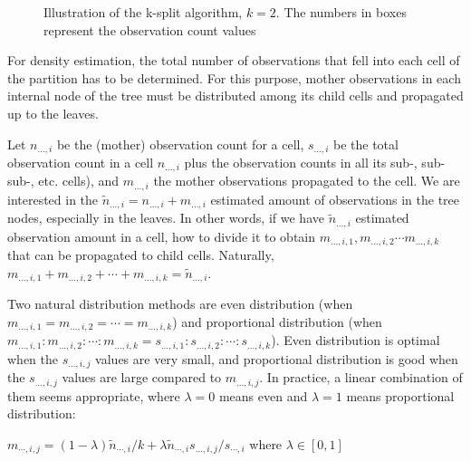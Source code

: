 \begin{figure}[htbp]
  \begin{center}
    
    \caption{Illustration of the k-split algorithm, $k=2$. The
      numbers in boxes represent the observation count values}
  \end{center}
\end{figure}


For density estimation, the total number of observations that
fell into each cell of the partition has to be determined. For
this purpose, mother observations in each internal node of the
tree must be distributed among its child cells and propagated
up to the leaves.


Let $n_{...,i}$ be the (mother) observation count for a cell,
$s_{...,i}$ be the total observation count in a cell $n_{...,i}$ plus
the observation counts in all its sub-, sub-sub-, etc. cells), and
$m_{...,i}$ the mother observations propagated to the cell. We are
interested in the $\tilde{n}_{...,i} = n_{...,i} + m_{...,i}$
estimated amount of observations in the tree nodes, especially in the
leaves. In other words, if we have $\tilde{n}_{...,i}$ estimated
observation amount in a cell, how to divide it to obtain
$m_{...,i,1}, m_{...,i,2} \cdots m_{...,i,k}$
that can be propagated to child cells. Naturally,
$m_{...,i,1} + m_{...,i,2} + \cdots + m_{...,i,k} = \tilde{n}_{...,i}$.


Two natural distribution methods are even
distribution (when
$m_{...,i,1} = m_{...,i,2} = \cdots = m_{...,i,k}$) and proportional
distribution (when
$m_{...,i,1} : m_{...,i,2} : \cdots : m_{...,i,k} = s_{...,i,1} : s_{...,i,2} : \cdots : s_{...,i,k}$).
Even distribution is optimal when the
$s_{...,i,j}$ values are very small, and proportional distribution is
good when the $s_{...,i,j}$ values are large compared to
$m_{...,i,j}$. In practice, a linear combination of them seems
appropriate, where $\lambda=0$ means even and $\lambda=1$ means
proportional distribution:


$m_{\cdots,i,j} = (1-\lambda)\tilde{n}_{\cdots,i}/k + \lambda \tilde{n}_{\cdots,i} s_{...,i,j} / s_{\cdots,i}$
where $\lambda\in[0,1]$

